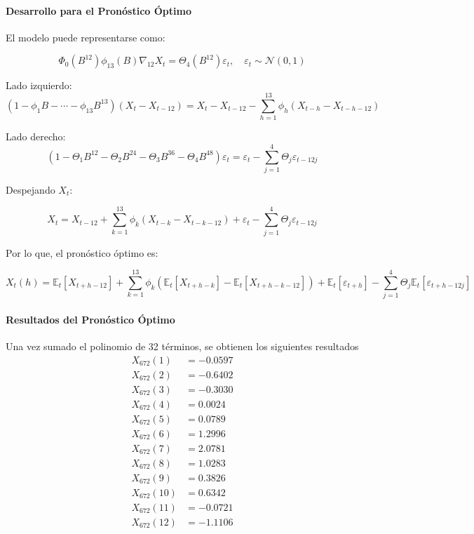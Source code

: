 \documentclass[12pt,letterpaper]{article}   %
\begin{document}
\paragraph{Desarrollo para el Pronóstico Óptimo}



El modelo puede representarse como:

\[
\Phi_0(B^{12}) \phi_{13}(B) \nabla_{12} X_t = \Theta_4(B^{12}) \varepsilon_t,\quad \varepsilon_t \sim \mathcal{N}(0, 1)
\]


\noindent Lado izquierdo:
\[
(1 - \phi_1 B - \cdots - \phi_{13} B^{13})(X_t - X_{t-12}) = X_t - X_{t-12} - \sum_{h=1}^{13} \phi_h (X_{t-h} - X_{t-h-12})
\]

\noindent Lado derecho:
\[
(1 - \Theta_1 B^{12} - \Theta_2 B^{24} - \Theta_3 B^{36} - \Theta_4 B^{48}) \varepsilon_t = \varepsilon_t - \sum_{j=1}^4 \Theta_j \varepsilon_{t - 12j}
\]

\noindent Despejando \( X_t \):

\[
X_t = X_{t-12} + \sum_{k=1}^{13} \phi_k (X_{t-k} - X_{t-k-12}) + \varepsilon_t - \sum_{j=1}^4 \Theta_j \varepsilon_{t - 12j}
\]

\noindent Por lo que, el pronóstico óptimo es:

\[
X_t(h) = \mathbb{E}_t[X_{t+h-12}] + \sum_{k=1}^{13} \phi_k \left( \mathbb{E}_t[X_{t+h-k}] - \mathbb{E}_t[X_{t+h-k-12}] \right) + \mathbb{E}_t[\varepsilon_{t+h}] - \sum_{j=1}^{4} \Theta_j \mathbb{E}_t[\varepsilon_{t+h - 12j}]
\]


\paragraph{Resultados del Pronóstico Óptimo}
Una vez sumado el polinomio de 32 términos, se obtienen los siguientes resultados
\begin{align*}
X_{672}(1)  &= -0.0597 \\
X_{672}(2)  &= -0.6402 \\
X_{672}(3)  &= -0.3030 \\
X_{672}(4)  &= 0.0024 \\
X_{672}(5)  &= 0.0789 \\
X_{672}(6)  &= 1.2996 \\
X_{672}(7)  &= 2.0781 \\
X_{672}(8)  &= 1.0283 \\
X_{672}(9)  &= 0.3826 \\
X_{672}(10) &= 0.6342 \\
X_{672}(11) &= -0.0721 \\
X_{672}(12) &= -1.1106
\end{align*}
\end{document}
